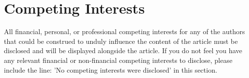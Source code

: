 \section*{Competing Interests}
All financial, personal, or professional competing interests for any of the authors that could be construed to unduly influence the content of the article must be disclosed and will be displayed alongside the article.
If you do not feel you have any relevant financial or non-financial competing interests to disclose, please include the line: 'No competing interests were disclosed' in this section. 